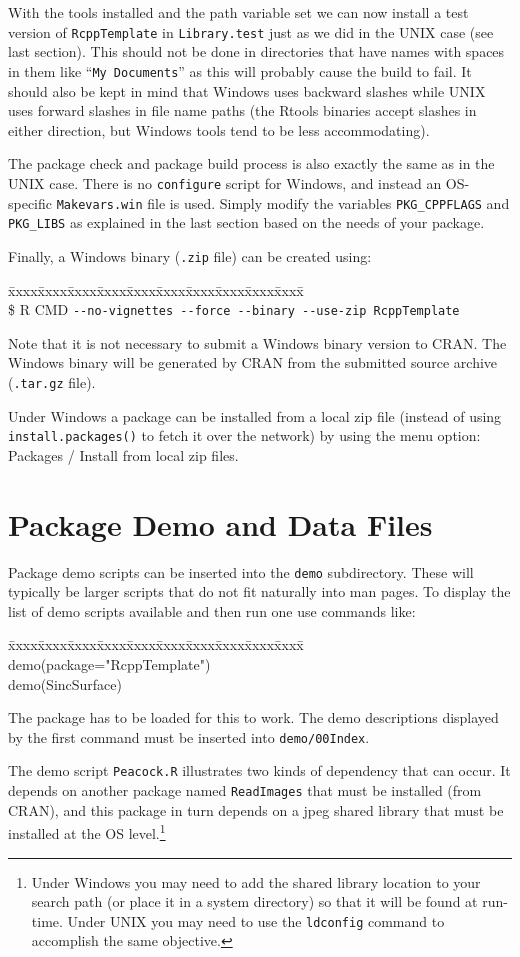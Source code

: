 \documentclass{article}
\newenvironment{program}{\ttfamily\begin{tabbing}
\=xxxx\=xxxx\=xxxx\=xxxx\=xxxx\=xxxx\=xxxx\=xxxx\=xxxx\=xxxx\= \+ \kill \\
}{\end{tabbing}}
\begin{document}
With the tools installed and the path variable set we can now install
a test version of {\tt RcppTemplate} in {\tt Library.test} just as we
did in the UNIX case (see last section). This should
not be done in directories that have names with spaces in them like 
``{\tt My Documents}'' as this will probably cause the build to fail. It
should also be kept in mind that Windows uses backward slashes while
UNIX uses forward slashes in file name paths (the Rtools binaries accept
slashes in either direction, but Windows tools tend to be less
accommodating).

The package check and package build process is also exactly the same
as in the UNIX case. There is no {\tt configure} script for Windows, and
instead an OS-specific {\tt Makevars.win} file is used. Simply
modify the variables {\tt PKG\_CPPFLAGS} and {\tt PKG\_LIBS} as explained
in the last section based on the needs of your package.

Finally, a Windows binary ({\tt .zip} file) can be created using:
\begin{program}
\$ R CMD \verb!--no-vignettes --force --binary --use-zip RcppTemplate!
\end{program}
Note that it is not necessary to submit a Windows binary version to CRAN.
The Windows binary will be generated by 
CRAN from the submitted source archive
({\tt .tar.gz} file).

Under Windows a package can be installed from a local zip file (instead
of using {\tt install.packages()} to fetch it over the network) by
using the menu option: Packages / Install from local zip files.


\section{Package Demo and Data Files}

Package demo scripts can be inserted into the {\tt demo} subdirectory. These
will typically be larger scripts that do not fit naturally into man pages.
To display the list of demo scripts available and then run one use
commands like:
\begin{program}
  demo(package="RcppTemplate")\\
  demo(SincSurface)
\end{program}
The package has to be loaded for this to work. The demo descriptions
displayed by the first command must be inserted into {\tt demo/00Index}.

The demo script {\tt Peacock.R} illustrates two kinds of dependency that
can occur. It
depends on another package named {\tt ReadImages} that must be installed
(from CRAN), and this package in turn depends on a jpeg shared library 
that must be installed at the OS level.\footnote{Under Windows you may
  need to add the shared library location to your search path (or
  place it in a system directory) so that it will be found at run-time.
  Under UNIX you may need to use the {\tt ldconfig} command to
  accomplish the same objective.}
\end{document}
